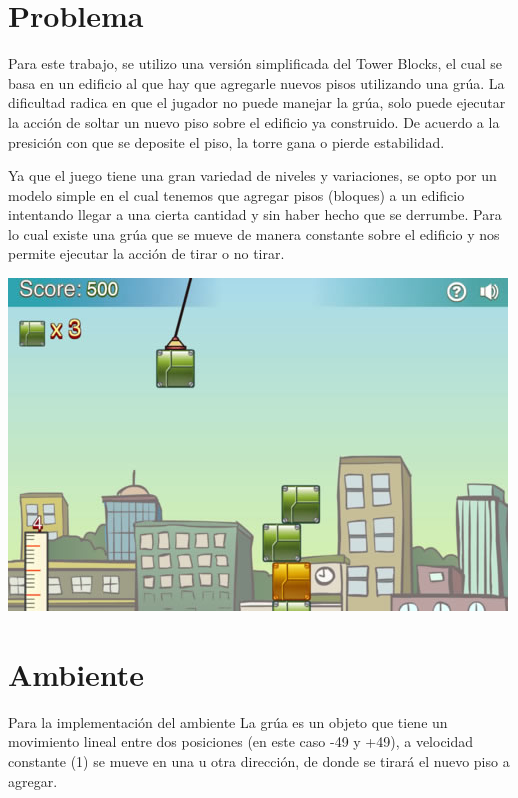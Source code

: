 \documentclass[11pt, a4paper]{article}
\begin{document}
	\maketitle

\section{Problema}
Para este trabajo, se utilizo una versi\'on simplificada del Tower Blocks, el cual se basa en un edificio al que hay que agregarle nuevos pisos utilizando una gr\'ua. La dificultad radica en que el jugador no puede manejar la gr\'ua, solo puede ejecutar la acci\'on de soltar un nuevo piso sobre el edificio ya construido. De acuerdo a la presici\'on con que se deposite el piso, la torre gana o pierde estabilidad. 

Ya que el juego tiene una gran variedad de niveles y variaciones, se opto por un modelo simple en el cual tenemos que agregar pisos (bloques) a un edificio intentando llegar a una cierta cantidad y sin haber hecho que se derrumbe. Para lo cual existe una gr\'ua que se mueve de manera constante sobre el edificio y nos permite ejecutar la acci\'on de tirar o no tirar. 

\begin{center} \includegraphics[scale=0.50]{towerblocks}
\end{center}
\section{Ambiente}
Para la implementaci\'on del ambiente
La grúa es un objeto que tiene un movimiento lineal entre dos posiciones (en este caso -49 y +49), a velocidad constante (1) se mueve en una u otra dirección, de donde se tirará el nuevo piso a agregar. 
\end{document}
